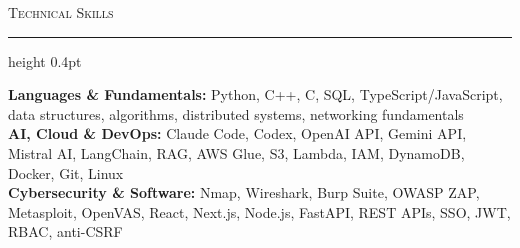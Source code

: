 \documentclass[letterpaper,11pt]{article}
\newcommand{\resumesection}[1]{%
  \par\vspace{2pt}%
  {\large\scshape #1}\par\vspace{2pt}%
  \hrule height 0.4pt\vspace{2pt}%
}
\begin{document}
\resumesection{Technical Skills}
\textbf{Languages \& Fundamentals:} Python, C++, C, SQL, TypeScript/JavaScript, data structures, algorithms, distributed systems, networking fundamentals\\
\textbf{AI, Cloud \& DevOps:} Claude Code, Codex, OpenAI API, Gemini API, Mistral AI, LangChain, RAG, AWS Glue, S3, Lambda, IAM, DynamoDB, Docker, Git, Linux\\
\textbf{Cybersecurity \& Software:} Nmap, Wireshark, Burp Suite, OWASP ZAP, Metasploit, OpenVAS, React, Next.js, Node.js, FastAPI, REST APIs, SSO, JWT, RBAC, anti-CSRF
\end{document}
